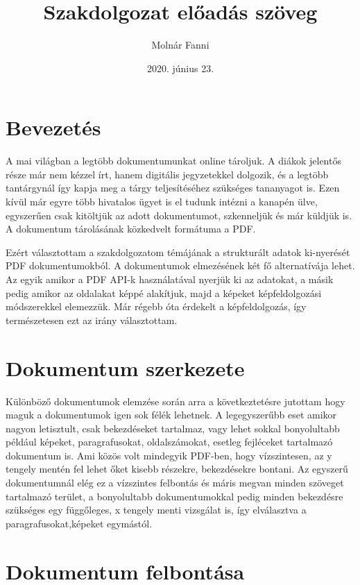 \documentclass{article}
\begin{document}
\title{Szakdolgozat előadás szöveg}
\author{Molnár Fanni}
\date{2020. június 23.}

\maketitle

\newpage

\section{Bevezetés}

A mai világban a legtöbb dokumentumunkat online tároljuk. A diákok jelentős része már nem kézzel írt, hanem digitális jegyzetekkel dolgozik, és a legtöbb tantárgynál így kapja meg a tárgy teljesítéséhez szükséges tananyagot is. Ezen kívül már egyre több hivatalos ügyet is el tudunk intézni a kanapén ülve, egyszerűen csak kitöltjük az adott dokumentumot, szkenneljük és már küldjük is.
A dokumentum tárolásának közkedvelt formátuma a PDF.

Ezért választottam a szakdolgozatom témájának a strukturált adatok ki-nye\-ré\-sét PDF dokumentumokból. A dokumentumok elmezésének két fő alternatívája lehet. Az egyik amikor a PDF API-k használatával nyerjük ki az adatokat, a másik pedig amikor az oldalakat képpé alakítjuk, majd a képeket kép\-fel\-dol\-go\-zá\-si módszerekkel elemezzük. Már régebb óta érdekelt a képfeldolgozás, így ter\-mé\-sze\-te\-sen ezt az irány választottam.

\section{Dokumentum szerkezete}

Különböző dokumentumok elemzése során arra a következtetésre jutottam hogy maguk a dokumentumok igen sok félék lehetnek. A legegyszerűbb eset amikor nagyon letisztult, csak bekezdéseket tartalmaz, vagy lehet sokkal bonyolultabb például képeket, paragrafusokat, oldalszámokat, esetleg fejléceket tartalmazó dokumentum is. Ami közös volt mindegyik PDF-ben, hogy vízszintesen, az y tengely mentén fel lehet őket kisebb részekre, bekezdésekre bontani. Az egyszerű dokumentumnál elég ez a vízszintes felbontás és máris megvan minden szöveget tartalmazó terület, a bonyolultabb dokumentumokkal pedig minden bekezdésre szükséges egy függőleges, x tengely menti vizsgálat is, így elválasztva a paragrafusokat,képeket egymástól.

\section{Dokumentum felbontása}
\end{document}
